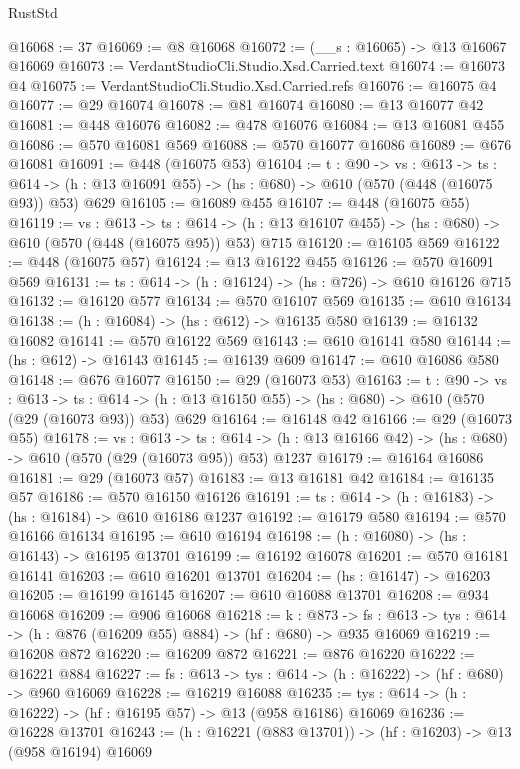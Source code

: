 \begin{lexlean}{RustStd}
\begin{coremodule}
@16068 := 37
@16069 := @8 @16068
@16072 := (__s : @16065) -> @13 @16067 @16069
@16073 := VerdantStudioCli.Studio.Xsd.Carried.text
@16074 := @16073 @4
@16075 := VerdantStudioCli.Studio.Xsd.Carried.refs
@16076 := @16075 @4
@16077 := @29 @16074
@16078 := @81 @16074
@16080 := @13 @16077 @42
@16081 := @448 @16076
@16082 := @478 @16076
@16084 := @13 @16081 @455
@16086 := @570 @16081 @569
@16088 := @570 @16077 @16086
@16089 := @676 @16081
@16091 := @448 (@16075 @53)
@16104 := {t : @90} ->
  {vs : @613} ->
  {ts : @614} -> (h : @13 @16091 @55) -> (hs : @680) -> @610 (@570 (@448 (@16075 @93)) @53) @629
@16105 := @16089 @455
@16107 := @448 (@16075 @55)
@16119 := {vs : @613} ->
  {ts : @614} -> (h : @13 @16107 @455) -> (hs : @680) -> @610 (@570 (@448 (@16075 @95)) @53) @715
@16120 := @16105 @569
@16122 := @448 (@16075 @57)
@16124 := @13 @16122 @455
@16126 := @570 @16091 @569
@16131 := {ts : @614} -> (h : @16124) -> (hs : @726) -> @610 @16126 @715
@16132 := @16120 @577
@16134 := @570 @16107 @569
@16135 := @610 @16134
@16138 := (h : @16084) -> (hs : @612) -> @16135 @580
@16139 := @16132 @16082
@16141 := @570 @16122 @569
@16143 := @610 @16141 @580
@16144 := (hs : @612) -> @16143
@16145 := @16139 @609
@16147 := @610 @16086 @580
@16148 := @676 @16077
@16150 := @29 (@16073 @53)
@16163 := {t : @90} ->
  {vs : @613} ->
  {ts : @614} -> (h : @13 @16150 @55) -> (hs : @680) -> @610 (@570 (@29 (@16073 @93)) @53) @629
@16164 := @16148 @42
@16166 := @29 (@16073 @55)
@16178 := {vs : @613} ->
  {ts : @614} -> (h : @13 @16166 @42) -> (hs : @680) -> @610 (@570 (@29 (@16073 @95)) @53) @1237
@16179 := @16164 @16086
@16181 := @29 (@16073 @57)
@16183 := @13 @16181 @42
@16184 := @16135 @57
@16186 := @570 @16150 @16126
@16191 := {ts : @614} -> (h : @16183) -> (hs : @16184) -> @610 @16186 @1237
@16192 := @16179 @580
@16194 := @570 @16166 @16134
@16195 := @610 @16194
@16198 := (h : @16080) -> (hs : @16143) -> @16195 @13701
@16199 := @16192 @16078
@16201 := @570 @16181 @16141
@16203 := @610 @16201 @13701
@16204 := (hs : @16147) -> @16203
@16205 := @16199 @16145
@16207 := @610 @16088 @13701
@16208 := @934 @16068
@16209 := @906 @16068
@16218 := {k : @873} ->
  {fs : @613} -> {tys : @614} -> (h : @876 (@16209 @55) @884) -> (hf : @680) -> @935 @16069
@16219 := @16208 @872
@16220 := @16209 @872
@16221 := @876 @16220
@16222 := @16221 @884
@16227 := {fs : @613} -> {tys : @614} -> (h : @16222) -> (hf : @680) -> @960 @16069
@16228 := @16219 @16088
@16235 := {tys : @614} -> (h : @16222) -> (hf : @16195 @57) -> @13 (@958 @16186) @16069
@16236 := @16228 @13701
@16243 := (h : @16221 (@883 @13701)) -> (hf : @16203) -> @13 (@958 @16194) @16069

\end{coremodule}
\end{lexlean}
